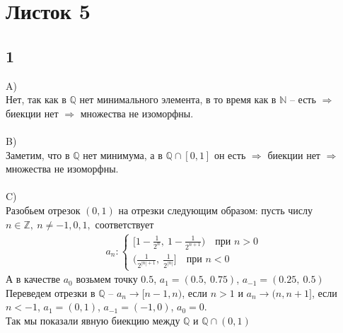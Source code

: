 \newpage	
	\section{Листок 5}
		
		\subsection{1}
		A)\\
		Нет, так как в $\mathbb{Q}$ нет минимального элемента, в то время как в $\mathbb{N}$ -- есть $\Rightarrow$ биекции нет $\Rightarrow$ множества не изоморфны.
		\\ \\
		B)\\
		Заметим, что в $\mathbb{Q}$ нет минимума, а в $\mathbb{Q} \cap [0, 1]$ он есть $\Rightarrow$ биекции нет $\Rightarrow$ множества не изоморфны.
		\\ \\
		C)\\
		Разобьем отрезок $(0, 1)$ на отрезки следующим образом: пусть числу $n \in \mathbb{Z}, \ n \ne -1,0,1,$ соответствует 
		\begin{gather*}
			a_n:
			\begin{cases}
				[ 1 - \frac{1}{2^{n}} ,\: 1 - \frac{1}{2^{n+1}}) \quad \text{при $n > 0$}\\
				(\frac{1}{2^{|n|+1}} ,\: \frac{1}{2^{|n|}}] \quad \text{при $n < 0$}
			\end{cases}
		\end{gather*}
		А в качестве $a_0$ возьмем точку $0.5$, $a_1 = (0.5,\: 0.75)$, $a_{-1} = (0.25,\: 0.5)$
		Переведем отрезки в $\mathbb{Q}$ -- $a_n \to [n-1, n)$, если $n > 1$ и $a_n \to (n, n+1]$, если $n < -1$, $a_1 = (0, 1)$, $a_{-1} = (-1, 0)$, $a_0 = 0$.\\
		Так мы показали явную биекцию между $\mathbb{Q}$ и $\mathbb{Q} \cap (0, 1)$
		
